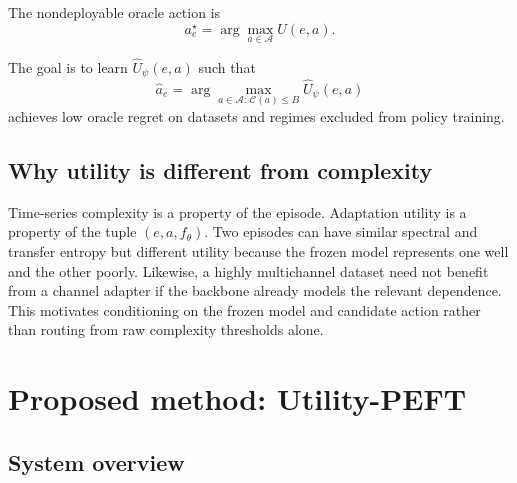 \documentclass[10pt]{article}
\newcommand{\method}{Utility-PEFT}
\newcommand{\Acal}{\mathcal{A}}
\newcommand{\Ccal}{\mathcal{C}}
\begin{document}
The nondeployable oracle action is
\begin{equation}
a_e^{\star}=\arg\max_{a\in\Acal}U(e,a).
\end{equation}

The goal is to learn $\widehat U_{\psi}(e,a)$ such that
\begin{equation}
\widehat a_e=\arg\max_{a\in\Acal:\,\Ccal(a)\le B} \widehat U_{\psi}(e,a)
\end{equation}
achieves low oracle regret on datasets and regimes excluded from policy training.

\subsection{Why utility is different from complexity}

Time-series complexity is a property of the episode. Adaptation utility is a property of the tuple $(e,a,f_{\theta})$. Two episodes can have similar spectral and transfer entropy but different utility because the frozen model represents one well and the other poorly. Likewise, a highly multichannel dataset need not benefit from a channel adapter if the backbone already models the relevant dependence. This motivates conditioning on the frozen model and candidate action rather than routing from raw complexity thresholds alone.

\section{Proposed method: \method}

\subsection{System overview}
\end{document}

